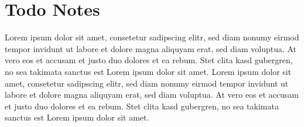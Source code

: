 \section{Todo Notes}

\lipsum[11]
\lipsum[11]
\lipsum[11]
\lipsum[11]
\lipsum[11]
\lipsum[11]

\newpage


\noindent \begin{minipage}{0.53\textwidth}
    Lorem ipsum dolor sit amet, consetetur sadipscing elitr, sed diam nonumy eirmod
    tempor invidunt ut labore et dolore magna aliquyam erat, sed diam voluptua. At
    vero eos et accusam et justo duo dolores et ea rebum. Stet clita kasd gubergren,
    no sea takimata sanctus est Lorem ipsum dolor sit amet. Lorem ipsum dolor sit
    amet, consetetur sadipscing elitr, sed diam nonumy eirmod tempor invidunt ut
    labore et dolore magna aliquyam erat, sed diam voluptua. At vero eos et accusam
    et justo duo dolores et ea rebum. Stet clita kasd gubergren, no sea takimata
    sanctus est Lorem ipsum dolor sit amet.
\end{minipage}
\hspace{0.05\textwidth}
\begin{minipage}{0.4\textwidth}
  \vspace{1cm}
  \centering
  \label{fig:limit_graph}
\end{minipage}

\newpage
